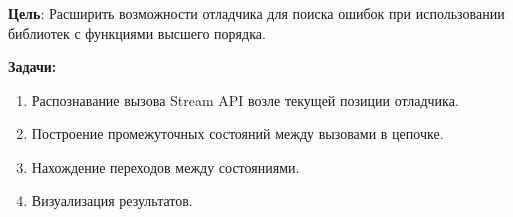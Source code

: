 \begin{frame}
	\frametitle{\insertsection} 
	\framesubtitle{\insertsubsection}
	\textbf{Цель}: Расширить возможности отладчика для поиска ошибок при использовании библиотек с функциями высшего порядка.
	
	\vspace{10px}
	\textbf{Задачи:}
	\begin{enumerate}
		\item Распознавание вызова Stream API возле текущей позиции отладчика.
		\item Построение промежуточных состояний между вызовами в цепочке.
		\item Нахождение переходов между состояниями.
		\item Визуализация результатов.
	\end{enumerate}
\end{frame}
